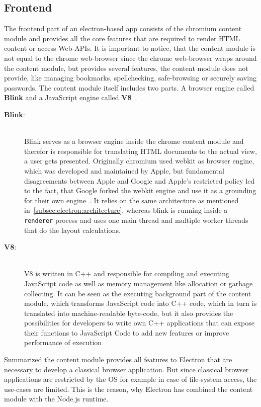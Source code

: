 \subsection{Frontend}
\label{subsec:electron:frontend}
The frontend part of an electron-based app consists of the chromium content module and provides all the core features that are required to render \ac{HTML} content
or access Web-\ac{API}s.
It is important to notice, that the content module is not equal to the chrome web-browser since the chrome web-browser wraps around the content module, but provides
several features, the content module does not provide, like managing bookmarks, spellchecking, safe-browsing or securely saving passwords.
The content module itself includes two parts.
A browser engine called \textbf{Blink} and a JavaScript engine called \textbf{V8}~\cite{electron-in-action}.
\begin{description}
    \item[\textbf{Blink}:] \hfill \\ Blink serves as a browser engine inside the chrome content module and therefor is responsible for translating \ac{HTML} documents to the actual view, a user gets presented.
    Originally chromium used webkit as browser engine, which was developed and maintained by Apple, but fundamental disagreements between Apple and Google and Apple's restricted policy led to the fact,
    that Google forked the webkit engine and use it as a grounding for their own engine~\cite{heiseBlink,blinkGoogle}.
    It relies on the same architecture as mentioned in~\ref{subsec:electron:architecture}, whereas blink is running inside a \texttt{renderer} process and uses one main thread
    and multiple worker threads that do the layout calculations.
    \item [\textbf{V8}:] \hfill \\ V8 is written in C++ and responsible for compiling and executing JavaScript code as well as memory management like allocation or garbage collecting.
    It can be seen as the executing background part of the content module, which transforms JavaScript code into C++ code, which in turn is translated into machine-readable byte-code,
    but it also provides the possibilities for developers to write own C++ applications that can expose their functions to JavaScript Code to add new features or improve performance of execution~\cite{V8Doc}

\end{description}
Summarized the content module provides all features to Electron that are necessary to develop a classical browser application.
But since classical browser applications are restricted by the OS for example in case of file-system access, the use-cases are limited.
This is the reason, why Electron has combined the content module with the Node.js runtime.

